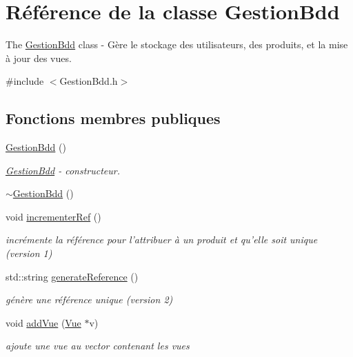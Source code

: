 \hypertarget{class_gestion_bdd}{\section{Référence de la classe Gestion\-Bdd}
\label{class_gestion_bdd}
}


The \hyperlink{class_gestion_bdd}{Gestion\-Bdd} class -\/ Gère le stockage des utilisateurs, des produits, et la mise à jour des vues.  




{\ttfamily \#include $<$Gestion\-Bdd.\-h$>$}

\subsection*{Fonctions membres publiques}
\begin{DoxyCompactItemize}
\item 
\hyperlink{class_gestion_bdd_aec9ad935a7fafff545f62c8c1452e8db}{Gestion\-Bdd} ()
\begin{DoxyCompactList}\small\item\em \hyperlink{class_gestion_bdd}{Gestion\-Bdd} -\/ constructeur. \end{DoxyCompactList}\item 
\hyperlink{class_gestion_bdd_a4398ba38755e93b303635ac5bd2713c6}{$\sim$\-Gestion\-Bdd} ()
\item 
void \hyperlink{class_gestion_bdd_acdaf971b3644b2aebbbb65a75b3e6c4c}{incrementer\-Ref} ()
\begin{DoxyCompactList}\small\item\em incrémente la référence pour l'attribuer à un produit et qu'elle soit unique (version 1) \end{DoxyCompactList}\item 
std\-::string \hyperlink{class_gestion_bdd_a6169a8867e04bcc950fe2e0fb2a5621d}{generate\-Reference} ()
\begin{DoxyCompactList}\small\item\em génère une référence unique (version 2) \end{DoxyCompactList}\item 
void \hyperlink{class_gestion_bdd_a029ffbc385ac5bbb665101308ae82ba0}{add\-Vue} (\hyperlink{class_vue}{Vue} $\ast$v)
\begin{DoxyCompactList}\small\item\em ajoute une vue au vector contenant les vues \end{DoxyCompactList}\item 

\end{DoxyCompactItemize}
